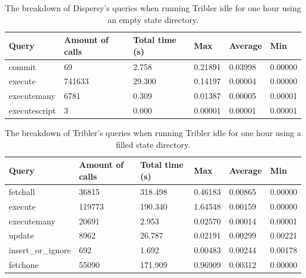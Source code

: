 \begin{table}[h]
	\centering
	\caption{The breakdown of Dispersy's queries when running Tribler idle for one hour using an empty state directory.}
	\label{table:query_breakdown_dispersy_empty_state_dir}
	\begin{tabular}{|l|l|l|l|l|l|}
		\hline
		\textbf{Query} & \textbf{Amount of calls} & \textbf{Total time (s)} & \textbf{Max} & \textbf{Average} & \textbf{Min} \\ \hline
		commit         & 69                       & 2.758                   & 0.21891      & 0.03998          & 0.00000      \\ \hline
		execute        & 741633                   & 29.300                  & 0.14197      & 0.00004          & 0.00000      \\ \hline
		executemany    & 6781                     & 0.309                   & 0.01387      & 0.00005          & 0.00001      \\ \hline
		executescript  & 3                        & 0.000                   & 0.00001      & 0.00001          & 0.00001      \\ \hline
	\end{tabular}
\end{table}

\begin{table}[h]
	\centering
	\caption{The breakdown of Tribler's queries when running Tribler idle for one hour using a filled state directory.}
	\label{table:query_breakdown_tribler_filled_state_dir}
	\begin{tabular}{|l|l|l|l|l|l|}
		\hline
		\textbf{Query} & \textbf{Amount of calls} & \textbf{Total time (s)} & \textbf{Max} & \textbf{Average} & \textbf{Min} \\ \hline
		fetchall   & 36815   & 318.498   & 0.46183   & 0.00865   & 0.00000   \\ \hline
		execute   & 119773   & 190.340   & 1.64548   & 0.00159   & 0.00000   \\ \hline
		executemany   & 20691   & 2.953   & 0.02570   & 0.00014   & 0.00001   \\ \hline
		update   & 8962   & 26.787   & 0.02191   & 0.00299   & 0.00221   \\ \hline
		insert\_or\_ignore   & 692   & 1.692   & 0.00483   & 0.00244   & 0.00178   \\ \hline
		fetchone   & 55090   & 171.909   & 0.96909   & 0.00312   & 0.00000   \\ \hline
	\end{tabular}
\end{table}

